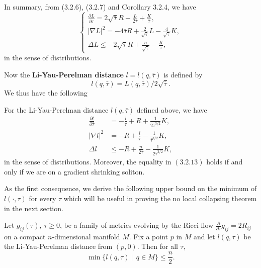 In summary, from (3.2.6), (3.2.7) and Corollary 3.2.4, we have
$$   \left\{
       \begin{array}{lll}
  \frac{\partial L}{\partial \bar{\tau}}
=2\sqrt{\bar{\tau}}R-\frac{L}{2\bar{\tau}}
  +\frac{K}{\bar{\tau}},\\[4mm]
  |\nabla L|^2=-4\bar{\tau}R+\frac{2}{\sqrt{\bar{\tau}}}L
-\frac{4}{\sqrt{\bar{\tau}}}K,\\[4mm]
  \Delta
  L\leq-2\sqrt{\bar{\tau}}R+\frac{n}{\sqrt{\bar{\tau}}}
-\frac{K}{\bar{\tau}},
       \end{array}
    \right.
$$
in the sense of distributions.

Now the \textbf{Li-Yau-Perelman distance}  $l=l(q,\bar{\tau})$ is defined by
$$l
(q,\bar{\tau})=L(q,\bar{\tau})/2\sqrt{\bar{\tau}}.
$$
We thus have the following

\begin{lemma}
  \label{lem:cz-identities-for-liyauperelman-distance}
For the Li-Yau-Perelman distance $l(q,\bar{\tau})$ defined above,
we have
\begin{align}
\frac{\partial l}{\partial  \bar{\tau}}
&=-\frac{l}{\bar{\tau}}+R+\frac{1}{2\bar{\tau}^{3/2}}K,\\
|\nabla l|^2&=-R+\frac{l}{\bar{\tau}}-\frac{1}{\bar{\tau}^{3/2}}K,\\
\Delta l
&\leq-R+\frac{n}{2\bar{\tau}}-\frac{1}{2\bar{\tau}^{3/2}}K,
\end{align}
in the sense of distributions. Moreover, the equality in
$(3.2.13)$ holds if and only if we are on a gradient shrinking
soliton.
\end{lemma}

As the first consequence, we derive the following upper bound on
the minimum of $l(\cdot,\tau)$ for every $\tau$ which will be
useful in proving the no local collapsing theorem in the next
section.

\begin{corollary}
  \label{cor:cz-conjugate-heat-inequality-for-reduced-density}
Let $g_{ij}(\tau)$, $\tau\geq 0$, be a family of metrics evolving
by the Ricci flow $\frac{\partial}{\partial \tau}g_{ij}=2R_{ij}$
on a compact $n$-dimensional manifold $M$. Fix a point $p$ in $M$
and let $l(q,\tau)$ be the Li-Yau-Perelman distance from $(p,0)$.
Then for all $\tau$,
$$
\min\{l(q,\tau)\ |\ \ q\in M\}\leq\frac{n}{2}.
$$
\end{corollary}

